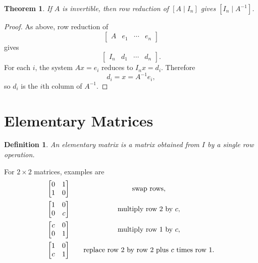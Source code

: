 \documentclass[11pt]{article}
\newtheorem*{theorem}{Theorem}
\newtheorem*{definition}{Definition}
\begin{document}
\begin{theorem}
If $A$ is invertible, then row reduction of $[A\mid I_n]$ gives $[I_n\mid A^{-1}]$.
\end{theorem}

\begin{proof}
As above, row reduction of
\[
\left[\begin{array}{c|ccc}A&e_1&\cdots&e_n\end{array}\right]
\]
gives
\[
\left[\begin{array}{c|ccc}I_n&d_1&\cdots&d_n\end{array}\right].
\]
For each $i$, the system $Ax=e_i$ reduces to $I_nx=d_i$.  Therefore
\[
d_i=x=A^{-1}e_i,
\]
so $d_i$ is the $i$th column of $A^{-1}$.
\end{proof}

\clearpage
\section{Elementary Matrices}

\begin{definition}
An \emph{elementary matrix} is a matrix obtained from $I$ by a single row operation.
\end{definition}

For $2\times2$ matrices, examples are
\[
\begin{array}{c@{\qquad}c}
\begin{bmatrix}0&1\\1&0\end{bmatrix} & \text{swap rows},\\[1.1em]
\begin{bmatrix}1&0\\0&c\end{bmatrix} & \text{multiply row 2 by $c$},\\[1.1em]
\begin{bmatrix}c&0\\0&1\end{bmatrix} & \text{multiply row 1 by $c$},\\[1.1em]
\begin{bmatrix}1&0\\c&1\end{bmatrix} & \text{replace row 2 by row 2 plus $c$ times row 1}.
\end{array}
\]
\end{document}
